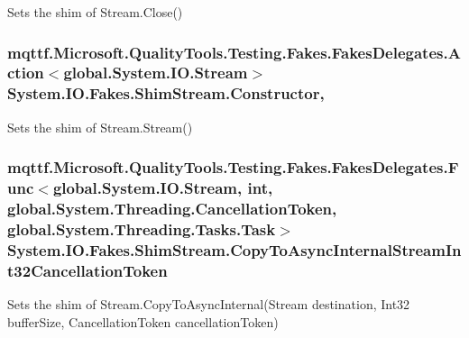 Sets the shim of Stream.\-Close()

\hypertarget{class_system_1_1_i_o_1_1_fakes_1_1_shim_stream_a8d34e6f79ebc6d7617caf4e2b3d77156}{
\subsubsection[{Constructor}]{\setlength{\rightskip}{0pt plus 5cm}mqttf.\-Microsoft.\-Quality\-Tools.\-Testing.\-Fakes.\-Fakes\-Delegates.\-Action$<$global.\-System.\-I\-O.\-Stream$>$ System.\-I\-O.\-Fakes.\-Shim\-Stream.\-Constructor\hspace{0.3cm}{\ttfamily [static]}, {\ttfamily [set]}}}\label{class_system_1_1_i_o_1_1_fakes_1_1_shim_stream_a8d34e6f79ebc6d7617caf4e2b3d77156}


Sets the shim of Stream.\-Stream()

\hypertarget{class_system_1_1_i_o_1_1_fakes_1_1_shim_stream_a72d3fda9cdf0317f4348dff23833135c}{
\subsubsection[{Copy\-To\-Async\-Internal\-Stream\-Int32\-Cancellation\-Token}]{\setlength{\rightskip}{0pt plus 5cm}mqttf.\-Microsoft.\-Quality\-Tools.\-Testing.\-Fakes.\-Fakes\-Delegates.\-Func$<$global.\-System.\-I\-O.\-Stream, int, global.\-System.\-Threading.\-Cancellation\-Token, global.\-System.\-Threading.\-Tasks.\-Task$>$ System.\-I\-O.\-Fakes.\-Shim\-Stream.\-Copy\-To\-Async\-Internal\-Stream\-Int32\-Cancellation\-Token\hspace{0.3cm}{\ttfamily [set]}}}\label{class_system_1_1_i_o_1_1_fakes_1_1_shim_stream_a72d3fda9cdf0317f4348dff23833135c}


Sets the shim of Stream.\-Copy\-To\-Async\-Internal(\-Stream destination, Int32 buffer\-Size, Cancellation\-Token cancellation\-Token)

